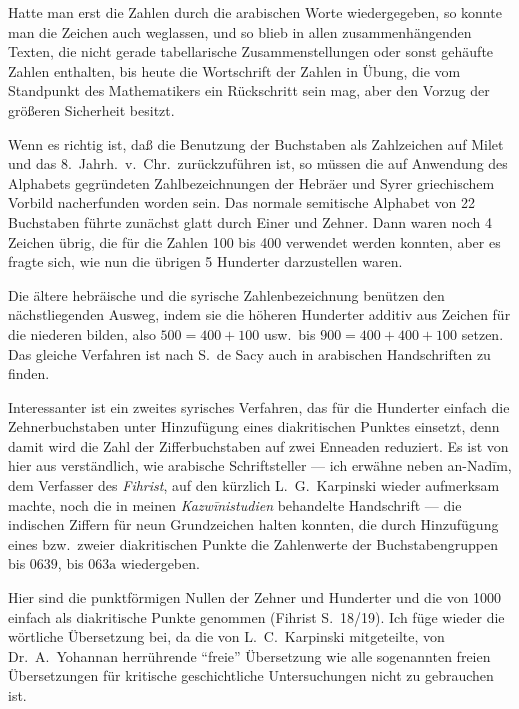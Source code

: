 \documentclass[11pt,a4paper]{article}
\newcommand{\enquote}[1]{``#1''}
\begin{document}
Hatte man erst die Zahlen durch die arabischen Worte wiedergegeben, so konnte man die Zeichen auch weglassen, und so blieb in allen zusammenh\"angenden Texten, die nicht gerade tabellarische Zusammenstellungen oder sonst geh\"aufte Zahlen enthalten, bis heute die Wortschrift der Zahlen in \"Ubung, die vom Standpunkt des Mathematikers ein R\"uckschritt sein mag, aber den Vorzug der gr\"o\ss{}eren Sicherheit besitzt.

Wenn es richtig ist, da\ss{} die Benutzung der Buchstaben als Zahlzeichen auf Milet und das 8.\ Jahrh.\ v.\ Chr.\ zur\"uckzuf\"uhren ist, so m\"ussen die auf Anwendung des Alphabets gegr\"undeten Zahlbezeichnungen der Hebr\"aer und Syrer griechischem Vorbild nacherfunden worden sein. Das normale semitische Alphabet von 22 Buchstaben f\"uhrte zun\"achst glatt durch Einer und Zehner. Dann waren noch 4 Zeichen \"ubrig, die f\"ur die Zahlen 100 bis 400 verwendet werden konnten, aber es fragte sich, wie nun die \"ubrigen 5 Hunderter darzustellen waren.

Die \"altere hebr\"aische und die syrische Zahlenbezeichnung ben\"utzen den n\"achstliegenden Ausweg, indem sie die h\"oheren Hunderter additiv aus Zeichen f\"ur die niederen bilden, also $500 = 400 + 100$ usw.\ bis $900 = 400 + 400 + 100$ setzen. Das gleiche Verfahren ist nach S.\ de Sacy auch in arabischen Handschriften zu finden.

Interessanter ist ein zweites syrisches Verfahren, das f\"ur die Hunderter einfach die Zehnerbuchstaben unter Hinzuf\"ugung eines diakritischen Punktes einsetzt, denn damit wird die Zahl der Zifferbuchstaben auf zwei Enneaden reduziert. Es ist von hier aus verst\"andlich, wie arabische Schriftsteller --- ich erw\"ahne neben an-Nad\={i}m, dem Verfasser des \textit{Fihrist}, auf den k\"urzlich L.\ G.\ Karpinski wieder aufmerksam machte, noch die in meinen \textit{Kazw\={i}nistudien} behandelte Handschrift --- die indischen Ziffern f\"ur neun Grundzeichen halten konnten, die durch Hinzuf\"ugung eines bzw.\ zweier diakritischen Punkte die Zahlenwerte der Buchstabengruppen bis $\text{\u0639}$, bis $\text{\u063a}$ wiedergeben.

Hier sind die punktf\"ormigen Nullen der Zehner und Hunderter und die von 1000 einfach als diakritische Punkte genommen (Fihrist S.\ 18/19). Ich f\"uge wieder die w\"ortliche \"Ubersetzung bei, da die von L.\ C.\ Karpinski mitgeteilte, von Dr.\ A.\ Yohannan herr\"uhrende \enquote{freie} \"Ubersetzung wie alle sogenannten freien \"Ubersetzungen f\"ur kritische geschichtliche Untersuchungen nicht zu gebrauchen ist.
\end{document}
